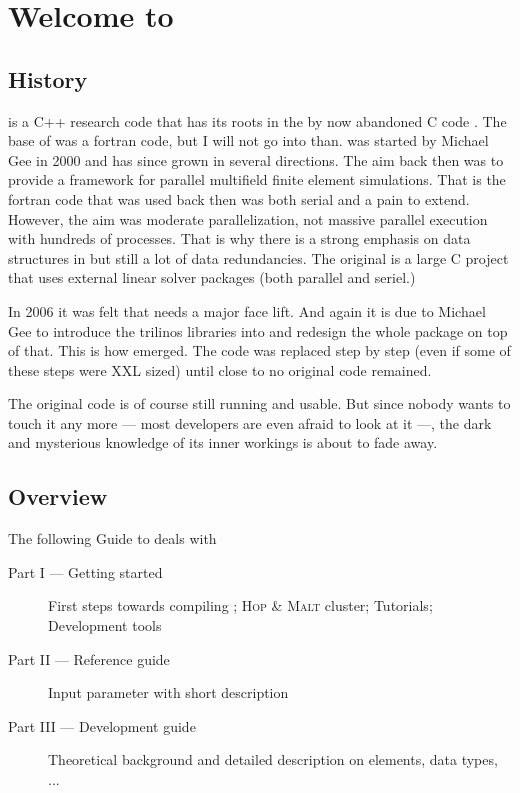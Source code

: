 \chapter{Welcome to \baci{}}

\section{History}

\baci{} is a C++ research code that has its roots in the by now abandoned
C code \ccarat{}. The base of \ccarat{} was a fortran code, but I will not go
into than. \ccarat{} was started by Michael Gee in 2000 and has since grown in
several directions. The aim back then was to provide a framework for parallel
multifield finite element simulations. That is the fortran code that was used
back then was both serial and a pain to extend. However, the aim was moderate
parallelization, not massive parallel execution with hundreds of
processes. That is why there is a strong emphasis on data structures in
\ccarat{} but still a lot of data redundancies. The original \ccarat{} is a
large C project that uses external linear solver packages (both parallel and
seriel.)

In 2006 it was felt that \ccarat{} needs a major face lift. And again
it is due to Michael Gee to introduce the trilinos libraries into
\ccarat{} and redesign the whole package on top of that. This is how \baci{}
emerged. The \ccarat{} code was replaced step by step (even if some of these
steps were XXL sized) until close to no original code remained.

The original \ccarat{} code is of course still running and usable. But since
nobody wants to touch it any more --- most developers are even afraid to look
at it ---, the dark and mysterious knowledge of its inner workings is about to
fade away.

\section{Overview}

The following Guide to \ccarat{} deals with

\begin{description}
\item[Part I --- Getting started] First steps towards compiling \ccarat{}; \textsc{Hop
  \& Malt} cluster; Tutorials;
  Development tools 
\item[Part II --- Reference guide] Input parameter with short description
\item[Part III --- Development guide] Theoretical background and detailed
  description   on elements, data types, ...
\end{description}
